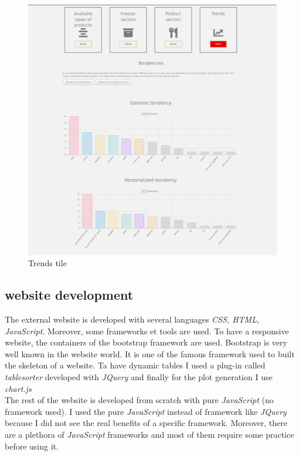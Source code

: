 \begin{figure}[H]
\centering
\includegraphics[scale=0.35]{./images/dashboard_trends.png}
\caption{Trends tile}
\label{fig:dashboard_trends}
\end{figure}

\subsection{website development}
The external website is developed with several languages \textit{CSS, HTML, JavaScript}. Moreover, some frameworks et tools are used. To have a responsive website, the containers of the bootstrap framework are used. Bootstrap is very well known in the website world. It is one of the famous framework used to built the skeleton of a website. Ta have dynamic tables I used a plug-in called \textit{tablesorter} developed with \textit{JQuery} and finally for the plot generation I use \textit{chart.js} \\

The rest of the website is developed from scratch with pure \textit{JavaScript} (no framework used). I used the pure \textit{JavaScript} instead of framework like \textit{JQuery} because I did not see the real benefits of a specific framework. Moreover, there are a plethora of \textit{JavaScript} frameworks and most of them require some practice before using it.\\

